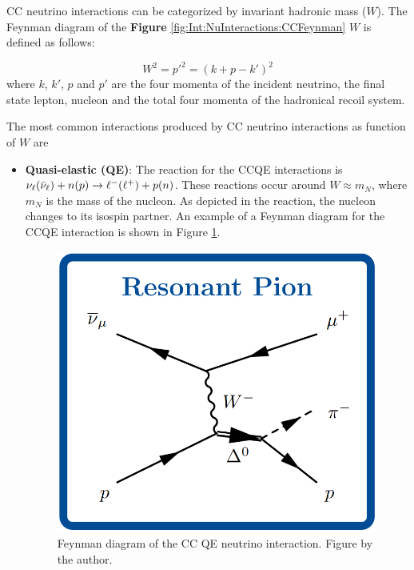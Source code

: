CC neutrino interactions can be categorized by invariant hadronic mass ($W$). The Feynman diagram of the \textbf{Figure} \ref{fig:Int:NuInteractions:CCFeynman} $W$ is defined as follows: 

\begin{equation}
    W^2 = p'^2 = (k +  p - k')^2
\end{equation}
 where $k$, $k'$, $p$ and $p'$ are the four momenta of the incident neutrino, the final state lepton, nucleon and the total four momenta of the hadronical recoil system. 

 The most common interactions produced by CC neutrino interactions as function of $W$ are 
 
\begin{itemize}
    \item \textbf{Quasi-elastic (QE)}: The reaction for the CCQE interactions is $\nu_\ell(\Bar{\nu}_\ell) + n(p)\rightarrow \ell^- (\ell^+) + p (n)$. These reactions occur around $W \approx m_N$, where $m_N$ is the mass of the nucleon. As depicted in the reaction, the nucleon changes to its isospin partner. An example of a Feynman diagram for the CCQE interaction is shown in Figure \ref{fig:Int:NuInteractions:CCQEFeynman}.

    \begin{figure}[!htb]
        \centering
        \includegraphics[scale=0.25]{Figures/Chapter1/ResonantChannel.png}
        \caption{Feynman diagram of the CC QE neutrino interaction. Figure by the author.}
        \label{fig:Int:NuInteractions:CCQEFeynman}
    \end{figure}
    

\end{itemize}
